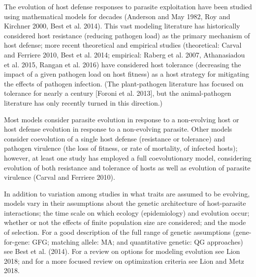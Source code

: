 The evolution of host defense responses to parasite exploitation have been studied using mathematical models for decades (Anderson and May 1982, Roy and Kirchner 2000, Best et al. 2014). This vast modeling literature has historically considered host resistance (reducing pathogen load) as the primary mechanism of host defense; more recent theoretical and empirical studies (theoretical: Carval and Ferriere 2010, Best et al. 2014; empirical: Raberg et al. 2007, Athanasiadou et al. 2015, Rangan et al. 2016) have considered host tolerance (decreasing the impact of a given pathogen load on host fitness) as a host strategy for mitigating the effects of pathogen infection. (The plant-pathogen literature has focused on tolerance for nearly a century [Foroni et al. 2013], but the animal-pathogen literature has only recently turned in this direction.) 

Most models consider parasite evolution in response to a non-evolving host or host defense evolution in response to a non-evolving parasite. Other models consider coevolution of a single host defense (resistance or tolerance) and pathogen virulence (the loss of fitness, or rate of mortality, of infected hosts); however, at least one study has employed a full coevolutionary model, considering evolution of both resistance and tolerance of hosts as well as evolution of parasite virulence (Carval and Ferriere 2010). 

In addition to variation among studies in what traits are assumed to be evolving, models vary in their assumptions about the genetic architecture of host-parasite interactions; the time scale on which ecology (epidemiology) and evolution occur; whether or not the effects of finite population size are considered; and the mode of selection. For a good description of the full range of genetic assumptions (gene-for-gene: GFG; matching allele: MA; and quantitative genetic: QG approaches) see Best et al. (2014). For a review on options for modeling evolution see Lion 2018; and for a more focused review on optimization criteria see Lion and Metz 2018.

